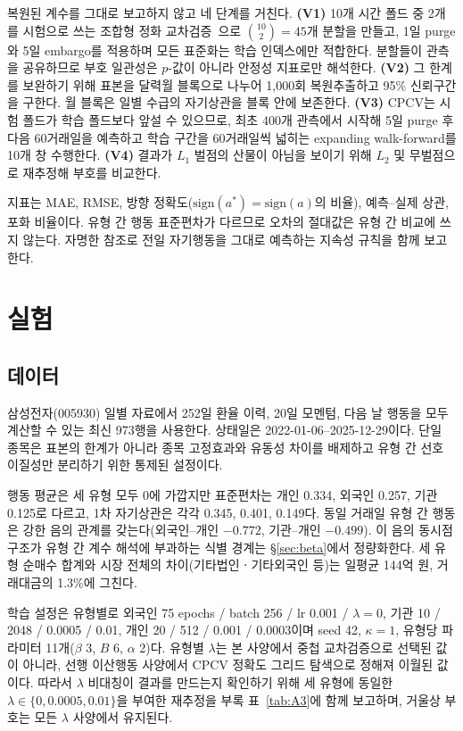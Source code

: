 복원된 계수를 그대로 보고하지 않고 네 단계를 거친다. \textbf{(V1)} 10개 시간 폴드
중 2개를 시험으로 쓰는 조합형 정화 교차검증~\cite{lopez2018advances}으로
$\binom{10}{2}=45$개 분할을 만들고, 1일 purge와 5일 embargo를 적용하며 모든
표준화는 학습 인덱스에만 적합한다. 분할들이 관측을 공유하므로 부호 일관성은
$p$-값이 아니라 안정성 지표로만 해석한다. \textbf{(V2)} 그 한계를 보완하기 위해
표본을 달력월 블록으로 나누어 1{,}000회 복원추출하고 95\% 신뢰구간을 구한다. 월
블록은 일별 수급의 자기상관을 블록 안에 보존한다. \textbf{(V3)} CPCV는 시험 폴드가
학습 폴드보다 앞설 수 있으므로, 최초 400개 관측에서 시작해 5일 purge 후 다음
60거래일을 예측하고 학습 구간을 60거래일씩 넓히는 expanding walk-forward를 10개 창
수행한다. \textbf{(V4)} 결과가 $L_1$ 벌점의 산물이 아님을 보이기 위해 $L_2$ 및
무벌점으로 재추정해 부호를 비교한다.

지표는 MAE, RMSE, 방향 정확도($\mathrm{sign}(a^{*})=\mathrm{sign}(a)$의 비율),
예측--실제 상관, 포화 비율이다. 유형 간 행동 표준편차가 다르므로 오차의 절대값은
유형 간 비교에 쓰지 않는다. 자명한 참조로 전일 자기행동을 그대로 예측하는 지속성
규칙을 함께 보고한다.

\section{실험}
\label{sec:experiments}

\subsection{데이터}
\label{sec:data}

삼성전자(005930) 일별 자료에서 252일 환율 이력, 20일 모멘텀, 다음 날 행동을 모두
계산할 수 있는 최신 973행을 사용한다. 상태일은 2022-01-06--2025-12-29이다. 단일
종목은 표본의 한계가 아니라 종목 고정효과와 유동성 차이를 배제하고 유형 간 선호
이질성만 분리하기 위한 통제된 설정이다.

행동 평균은 세 유형 모두 0에 가깝지만 표준편차는 개인 0.334, 외국인 0.257, 기관
0.125로 다르고, 1차 자기상관은 각각 0.345, 0.401, 0.149다. 동일 거래일 유형 간
행동은 강한 음의 관계를 갖는다(외국인--개인 $-0.772$, 기관--개인 $-0.499$). 이 음의
동시점 구조가 유형 간 계수 해석에 부과하는 식별 경계는 \S\ref{sec:beta}에서
정량화한다. 세 유형 순매수 합계와 시장 전체의 차이(기타법인ㆍ기타외국인 등)는
일평균 144억 원, 거래대금의 1.3\%에 그친다.

학습 설정은 유형별로 외국인 75 epochs / batch 256 / lr 0.001 / $\lambda=0$, 기관
10 / 2048 / 0.0005 / 0.01, 개인 20 / 512 / 0.001 / 0.0003이며 seed 42, $\kappa=1$,
유형당 파라미터 11개($\beta$ 3, $B$ 6, $\alpha$ 2)다. 유형별 $\lambda$는 본
사양에서 중첩 교차검증으로 선택된 값이 아니라, 선행 이산행동 사양에서 CPCV 정확도
그리드 탐색으로 정해져 이월된 값이다. 따라서 $\lambda$ 비대칭이 결과를 만드는지
확인하기 위해 세 유형에 동일한 $\lambda\in\{0,0.0005,0.01\}$을 부여한 재추정을 부록
표~\ref{tab:A3}에 함께 보고하며, 거울상 부호는 모든 $\lambda$ 사양에서 유지된다.


